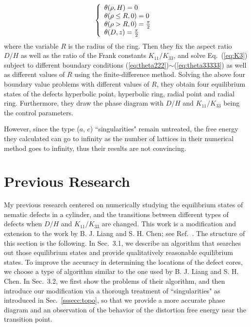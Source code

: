 \documentclass[nottitlepage]{article}
\begin{document}
   
     
   
              \begin{equation}\label{eq:theta33333}
                    \left\{
                    \begin{array}{l l l l}
   
                    \theta(\rho,H)=0\\
                   \theta(\rho\le R,0)=0 \\
                   \theta(\rho>R,0)=\frac{\pi}{2} \\
                   \theta(D,z)=\frac{\pi}{2}\\
                    \end{array}
                    \right.\
                    \end{equation}
  where the variable $R$ is the radius of the ring. Then they fix the aspect ratio $D/H$ as well as the ratio of the Frank constants $K_{11}/K_{33}$, and solve Eq.~(\ref{eq:K3}) subject to different boundary conditions (\ref{eq:theta222})$\sim$(\ref{eq:theta33333}) as well as different values of $R$ using the finite-difference method. Solving the above four boundary value problems with different values of $R$, they obtain four equilibrium states of the defects hyperbolic point, hyperbolic ring, radial point and radial ring.  Furthermore, they draw the phase diagram with $D/H$ and $K_{11}/K_{33}$  being the control parameters. 
     
     However, since the type ($a$, $c$) ``singularities"  remain untreated, the free energy they calculated can go to infinity as the number of lattices in their numerical method goes to infinity, thus their results are not convincing.        
                    
   

\section {Previous Research}\label{sec:AA}
      My previous research centered on numerically studying the equilibrium states of nematic defects in a cylinder, and the transitions between different types of defects when $D/H$ and $K_{11}/K_{33}$ are changed. This work is a modification and extension to the work by B. J. Liang and S. H. Chen; see Ref.~\cite{liang}.  
      The structure of this section is the following. In Sec.~3.1, we describe an algorithm that searches out those equilibrium states and provide qualitatively reasonable equilibrium states. To improve the accuracy in determining the locations of the defect cores, we choose a type of algorithm similar to the one used by B. J. Liang and S. H. Chen.  In Sec.~3.2, we first show the problems of their algorithm, and then introduce our modification via a thorough treatment of ``singularities" as introduced in Sec.~\ref{sssecc:topo}, so that we  provide a more accurate phase diagram and an observation of the behavior of the distortion free energy near the transition point.
      
\end{document}
